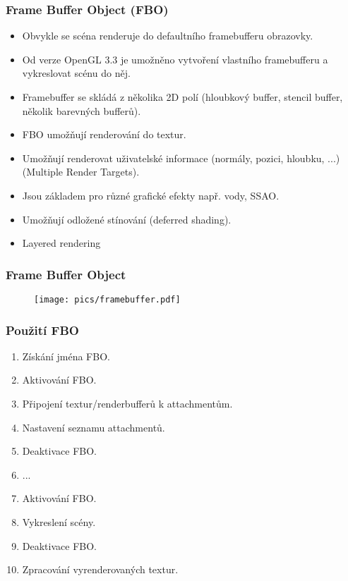 \begin{frame}[fragile]
\frametitle{Frame Buffer Object (FBO)}
  \begin{itemize}
    \item Obvykle se scéna renderuje do defaultního framebufferu obrazovky.
    \item Od verze OpenGL 3.3 je umožněno vytvoření vlastního framebufferu a vykreslovat scénu do něj.
    \item Framebuffer se skládá z několika 2D polí (hloubkový buffer, stencil buffer, několik barevných bufferů).
    \item{FBO umožňují renderování do textur.}
    \item{Umožňují renderovat uživatelské informace (normály, pozici, hloubku, ...) (Multiple Render Targets).}
    \item{Jsou základem pro různé grafické efekty např. vody, SSAO.}
    \item{Umožňují odložené stínování (deferred shading).}
    \item{Layered rendering}
  \end{itemize}
\end{frame}

\begin{frame}
\frametitle{Frame Buffer Object}
  \begin{figure}[h]
  \texttt{[image: pics/framebuffer.pdf]}
  \end{figure}
\end{frame}


\begin{frame}
\frametitle{Použití FBO}
    \begin{enumerate}
        \item{Získání jména FBO.}
        \item{Aktivování FBO.}
        \item{Připojení textur/renderbufferů k attachmentům.}
        \item{Nastavení seznamu attachmentů.}
        \item{Deaktivace FBO.}
        \item{...}
        \item{Aktivování FBO.}
        \item{Vykreslení scény.}
        \item{Deaktivace FBO.}
        \item{Zpracování vyrenderovaných textur.}
    \end{enumerate}
\end{frame}

